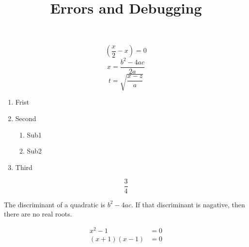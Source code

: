 \documentclass{article}
\title{Errors and Debugging}
\begin{document}
\maketitle

$$ \left( \frac{x}{2}-x\right) = 0 $$
$$ x=\frac{b^2-4ac}{2a} $$
$$ t=\sqrt{\frac{x-z}{a}} $$

\begin{enumerate}
    \item Frist
    \item Second
        \begin{enumerate}
            \item Sub1
            \item Sub2
        \end{enumerate}
    \item Third
\end{enumerate}

$$ \frac{3}{4} $$

The discriminant of a quadratic is $ b^2 - 4ac$.
If that discriminant is nagative, then there are no real roots.

\begin{align}
x^2-1 &= 0\\
(x+1)(x-1) &= 0 
\end{align}
\end{document}
